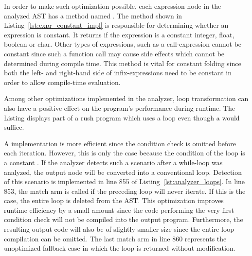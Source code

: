 
In order to make such optimization possible, each expression node in the analyzed AST has a method named .
The method shown in Listing~\ref{lst:expr_constant_impl} is responsible for determining whether an expression is constant.
It returns  if the expression is a constant integer, float, boolean or char.
Other types of expressions, such as a call-expression cannot be constant since such a function call may cause side effects which cannot be determined during compile time.
This method is vital for constant folding since both the left- and right-hand side of infix-expressions need to be constant in order to allow compile-time evaluation.

Among other optimizations implemented in the analyzer, loop transformation can also have a positive effect on the program's performance during runtime.
The Listing displays part of a rush program which uses a  loop even though a  would suffice.


A  implementation is more efficient since the condition check is omitted before each iteration.
However, this is only the case because the condition of the loop is a constant .
If the analyzer detects such a scenario after a while-loop was analyzed, the output node will be converted into a conventional loop.
Detection of this scenario is implemented in line 855 of Listing~\ref{lst:analyzer_loops}.
In line 853, the match arm is called if the preceding loop will never iterate.
If this is the case, the entire loop is deleted from the AST.
This optimization improves runtime efficiency by a small amount since the code performing the very first condition check will not be compiled into the output program.
Furthermore, the resulting output code will also be of slightly smaller size since the entire loop compilation can be omitted.
The last match arm in line 860 represents the unoptimized fallback case in which the loop is returned without modification.


